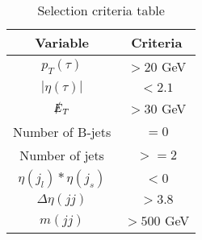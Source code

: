 \begin{table}
\centering
\begin{tabular}{|c|c|}
\hline
Variable & Criteria \\
\hline
$p_{T}(\tau)$ & $> 20$ GeV \\
$|\eta(\tau)|$ & $< 2.1$ \\ 
$\slashed{E}_{T}$ & $> 30$ GeV \\
Number of B-jets & $= 0$ \\
Number of jets & $ >= 2$ \\
$\eta(j_{l})*\eta(j_{s})$ & $<0$ \\
$\Delta \eta(jj)$ & $ > 3.8$ \\
$m(jj)$ & $> 500$ GeV \\
\hline
\end{tabular}
\caption{Selection criteria table}
\label{table: cuts}
\end{table}
